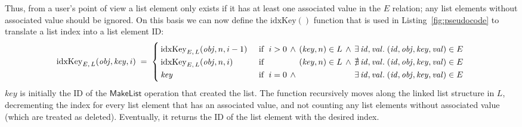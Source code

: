 Thus, from a user's point of view a list element only exists if it has at least one associated value in the $E$ relation; any list elements without associated value should be ignored.
On this basis we can now define the $\mathrm{idxKey}()$ function that is used in Listing~\ref{fig:pseudocode} to translate a list index into a list element ID:
\[ \mathrm{idxKey}_{E,\, L}(\mathit{obj}, \mathit{key}, i) \;=\; \left\{
   \arraycolsep=2pt \def\arraystretch{1.3}
   \begin{array}{llllll}
       \mathrm{idxKey}_{E,\, L}(\mathit{obj}, n, i-1) &
       \quad\text{if }\; i > 0 & \wedge & (\mathit{key}, n) \in L & \wedge &
       \exists\,\mathit{id}, \mathit{val}.\; (\mathit{id}, \mathit{obj}, \mathit{key}, \mathit{val}) \in E \\
       \mathrm{idxKey}_{E,\, L}(\mathit{obj}, n, i) &
       \quad\text{if }\; && (\mathit{key}, n) \in L & \wedge &
       \nexists\,\mathit{id}, \mathit{val}.\; (\mathit{id}, \mathit{obj}, \mathit{key}, \mathit{val}) \in E \\
       \mathit{key} &
       \quad\text{if }\; i = 0 & \wedge &&&
       \exists\,\mathit{id}, \mathit{val}.\; (\mathit{id}, \mathit{obj}, \mathit{key}, \mathit{val}) \in E \\
   \end{array} \right. \]
$\mathit{key}$ is initially the ID of the $\mathsf{MakeList}$ operation that created the list.
The function recursively moves along the linked list structure in $L$, decrementing the index for every list element that has an associated value, and not counting any list elements without associated value (which are treated as deleted).
Eventually, it returns the ID of the list element with the desired index.
